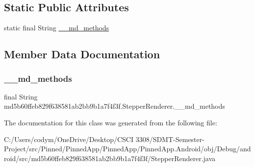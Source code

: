 \subsection*{Static Public Attributes}
\begin{DoxyCompactItemize}
\item 
static final String \hyperlink{classmd5b60ffeb829f638581ab2bb9b1a7f4f3f_1_1_stepper_renderer_ae75360821f2ab13475b89986650b0f66}{\+\_\+\+\_\+md\+\_\+methods}
\end{DoxyCompactItemize}


\subsection{Member Data Documentation}
\mbox{\label{classmd5b60ffeb829f638581ab2bb9b1a7f4f3f_1_1_stepper_renderer_ae75360821f2ab13475b89986650b0f66}} 
\subsubsection{\texorpdfstring{\+\_\+\+\_\+md\+\_\+methods}{\_\_md\_methods}}
{\footnotesize\ttfamily final String md5b60ffeb829f638581ab2bb9b1a7f4f3f.\+Stepper\+Renderer.\+\_\+\+\_\+md\+\_\+methods\hspace{0.3cm}{\ttfamily [static]}}



The documentation for this class was generated from the following file\+:\begin{DoxyCompactItemize}
\item 
C\+:/\+Users/codym/\+One\+Drive/\+Desktop/\+C\+S\+C\+I 3308/\+S\+D\+M\+T-\/\+Semester-\/\+Project/src/\+Pinned/\+Pinned\+App/\+Pinned\+App/\+Pinned\+App.\+Android/obj/\+Debug/android/src/md5b60ffeb829f638581ab2bb9b1a7f4f3f/Stepper\+Renderer.\+java\end{DoxyCompactItemize}
